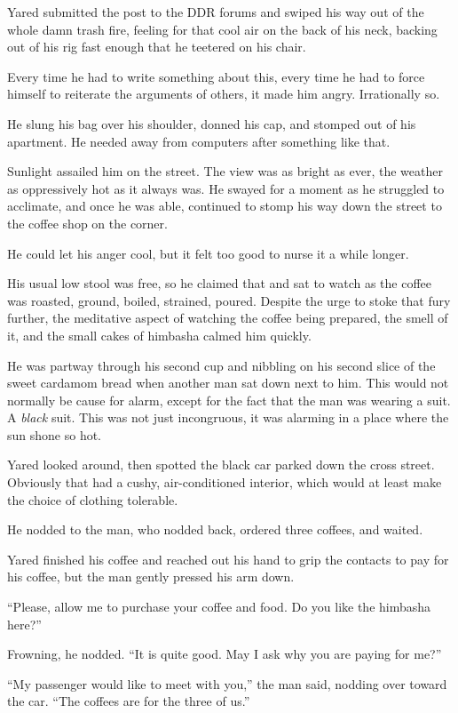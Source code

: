 Yared submitted the post to the DDR forums and swiped his way out of the whole damn trash fire, feeling for that cool air on the back of his neck, backing out of his rig fast enough that he teetered on his chair.

Every time he had to write something about this, every time he had to force himself to reiterate the arguments of others, it made him angry. Irrationally so.

He slung his bag over his shoulder, donned his cap, and stomped out of his apartment. He needed away from computers after something like that.

Sunlight assailed him on the street. The view was as bright as ever, the weather as oppressively hot as it always was. He swayed for a moment as he struggled to acclimate, and once he was able, continued to stomp his way down the street to the coffee shop on the corner.

He could let his anger cool, but it felt too good to nurse it a while longer.

His usual low stool was free, so he claimed that and sat to watch as the coffee was roasted, ground, boiled, strained, poured. Despite the urge to stoke that fury further, the meditative aspect of watching the coffee being prepared, the smell of it, and the small cakes of himbasha calmed him quickly.

He was partway through his second cup and nibbling on his second slice of the sweet cardamom bread when another man sat down next to him. This would not normally be cause for alarm, except for the fact that the man was wearing a suit. A \emph{black} suit. This was not just incongruous, it was alarming in a place where the sun shone so hot.

Yared looked around, then spotted the black car parked down the cross street. Obviously that had a cushy, air-conditioned interior, which would at least make the choice of clothing tolerable.

He nodded to the man, who nodded back, ordered three coffees, and waited.

Yared finished his coffee and reached out his hand to grip the contacts to pay for his coffee, but the man gently pressed his arm down.

``Please, allow me to purchase your coffee and food. Do you like the himbasha here?''

Frowning, he nodded. ``It is quite good. May I ask why you are paying for me?''

``My passenger would like to meet with you,'' the man said, nodding over toward the car. ``The coffees are for the three of us.''

